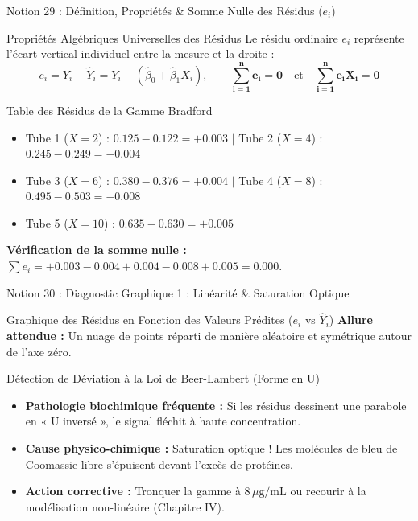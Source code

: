 \documentclass[aspectratio=169,10pt]{beamer}
\begin{document}
\begin{frame}{Notion 29 : Définition, Propriétés \& Somme Nulle des Résidus ($e_i$)}
  \begin{conceptbox}{Propriétés Algébriques Universelles des Résidus}
    \footnotesize
    Le résidu ordinaire $e_i$ représente l'écart vertical individuel entre la mesure et la droite :
    \begin{equation*}
      e_i = Y_i - \hat{Y}_i = Y_i - (\hat{\beta}_0 + \hat{\beta}_1 X_i), \qquad \mathbf{\sum_{i=1}^n e_i = 0} \quad \text{et} \quad \mathbf{\sum_{i=1}^n e_i X_i = 0}
    \end{equation*}
  \end{conceptbox}
  \vspace{1mm}
  \begin{biobox}{Table des Résidus de la Gamme Bradford}
    \footnotesize
    \begin{itemize}
      \item Tube 1 ($X=2$) : $0.125 - 0.122 = \mathbf{+0.003}$ \quad $\vert$ \quad Tube 2 ($X=4$) : $0.245 - 0.249 = \mathbf{-0.004}$
      \item Tube 3 ($X=6$) : $0.380 - 0.376 = \mathbf{+0.004}$ \quad $\vert$ \quad Tube 4 ($X=8$) : $0.495 - 0.503 = \mathbf{-0.008}$
      \item Tube 5 ($X=10$) : $0.635 - 0.630 = \mathbf{+0.005}$
    \end{itemize}
    \textbf{Vérification de la somme nulle :}
    $\sum e_i = +0.003 - 0.004 + 0.004 - 0.008 + 0.005 = \mathbf{0.000}$.
  \end{biobox}
\end{frame}

\begin{frame}{Notion 30 : Diagnostic Graphique 1 : Linéarité \& Saturation Optique}
  \begin{conceptbox}{Graphique des Résidus en Fonction des Valeurs Prédites ($e_i$ vs $\hat{Y}_i$)}
    \footnotesize
    \textbf{Allure attendue :} Un nuage de points réparti de manière aléatoire et symétrique autour de l'axe zéro.
  \end{conceptbox}
  \vspace{1mm}
  \begin{warnbox}{Détection de Déviation à la Loi de Beer-Lambert (Forme en U)}
    \footnotesize
    \begin{itemize}
      \item \textbf{Pathologie biochimique fréquente :} Si les résidus dessinent une parabole en « U inversé », le signal fléchit à haute concentration.
      \item \textbf{Cause physico-chimique :} Saturation optique ! Les molécules de bleu de Coomassie libre s'épuisent devant l'excès de protéines.
      \item \textbf{Action corrective :} Tronquer la gamme à $8\,\mu\text{g/mL}$ ou recourir à la modélisation non-linéaire (Chapitre IV).
    \end{itemize}
  \end{warnbox}
\end{frame}
\end{document}
